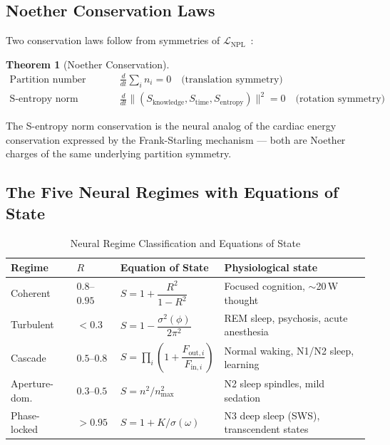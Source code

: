 \documentclass[10pt,twocolumn,a4paper]{article}
\theoremstyle{definition}
\newtheorem{theorem}{Theorem}
\newcommand{\SE}{S_{\text{entropy}}}
\newcommand{\SK}{S_{\text{knowledge}}}
\newcommand{\ST}{S_{\text{time}}}
\newcommand{\LNPL}{\mathcal{L}_{\text{NPL}}}
\begin{document}
\subsection{Noether Conservation Laws}

Two conservation laws follow from symmetries of $\LNPL$~\cite{noether1918invariante,goldstein2002classical}:

\begin{theorem}[Noether Conservation]
\begin{align}
\text{Partition number conservation:} &\quad \frac{d}{dt}\sum_i n_i = 0 \quad \text{(translation symmetry)}\\
\text{S-entropy norm conservation:} &\quad \frac{d}{dt}\|(\SK, \ST, \SE)\|^2 = 0 \quad \text{(rotation symmetry)}
\end{align}
\end{theorem}

The S-entropy norm conservation is the neural analog of the cardiac
energy conservation expressed by the Frank-Starling mechanism —
both are Noether charges of the same underlying partition symmetry.

\subsection{The Five Neural Regimes with Equations of State}

\begin{table}[H]
\centering
\caption{Neural Regime Classification and Equations of State}
\label{tab:neural_regimes}
\begin{tabular}{lllp{4.5cm}}
\toprule
\textbf{Regime} & \textbf{$R$} & \textbf{Equation of State} & \textbf{Physiological state}\\
\midrule
Coherent & $0.8$--$0.95$ & $S = 1 + \dfrac{R^2}{1-R^2}$ & Focused cognition, $\sim$20\,W thought\\[8pt]
Turbulent & $<0.3$ & $S = 1 - \dfrac{\sigma^2(\phi)}{2\pi^2}$ & REM sleep, psychosis, acute anesthesia\\[8pt]
Cascade & $0.5$--$0.8$ & $S = \prod_i\!\left(1 + \dfrac{F_{\text{out},i}}{F_{\text{in},i}}\right)$ & Normal waking, N1/N2 sleep, learning\\[8pt]
Aperture-dom. & $0.3$--$0.5$ & $S = n^2/n^2_{\max}$ & N2 sleep spindles, mild sedation\\[8pt]
Phase-locked & $>0.95$ & $S = 1 + K/\sigma(\omega)$ & N3 deep sleep (SWS), transcendent states\\[8pt]
\bottomrule
\end{tabular}
\end{table}
\end{document}

